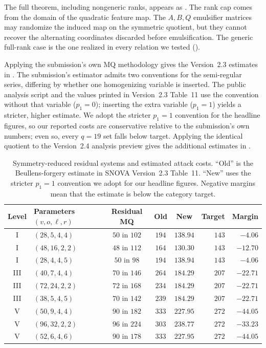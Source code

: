 \documentclass[11pt]{article}
\newcommand{\SNOVA}{\textsf{SNOVA}}
\begin{document}
The full theorem, including nongeneric ranks, appears as .  The rank cap comes from the domain of the quadratic feature map.  The $A,B,Q$ emulsifier matrices may randomize the induced map on the symmetric quotient, but they cannot recover the alternating coordinates discarded before emulsification.  The generic full-rank case is the one realized in every relation we tested ().

Applying the submission's own MQ methodology gives the Version~2.3 estimates in .  The submission's estimator admits two conventions for the semi-regular series, differing by whether one homogenizing variable is inserted.  The public analysis script and the values printed in Version~2.3 Table~11 use the convention without that variable ($p_1=0$); inserting the extra variable ($p_1=1$) yields a stricter, higher estimate.  We adopt the stricter $p_1=1$ convention for the headline figures, so our reported costs are conservative relative to the submission's own numbers; even so, every $q=19$ set falls below target.  Applying the identical quotient to the Version~2.4 analysis preview gives the additional estimates in .

\begin{table}[t]
\centering
\caption{Symmetry-reduced residual systems and estimated attack costs.  ``Old'' is the Beullens-forgery estimate in \SNOVA{} Version~2.3 Table~11.  ``New'' uses the stricter $p_1=1$ convention we adopt for our headline figures.  Negative margins mean that the estimate is below the category target.}\label{tab:main}
\small
\setlength{\tabcolsep}{4.2pt}
\begin{tabular}{@{}c l c c c r r@{}}
\toprule
Level & Parameters $(v,o,\ell,r)$ & Residual MQ & Old & New & Target & Margin\\
\midrule
I   & $(28,5,4,4)$   & $50$ in $102$ & $194$ & $138.94$ & $143$ & $-4.06$\\
I   & $(48,16,2,2)$  & $48$ in $112$ & $164$ & $130.30$ & $143$ & $-12.70$\\
I   & $(28,4,4,5)$   & $50$ in $98$  & $194$ & $138.94$ & $143$ & $-4.06$\\
\midrule
III & $(40,7,4,4)$   & $70$ in $146$ & $264$ & $184.29$ & $207$ & $-22.71$\\
III & $(72,24,2,2)$  & $72$ in $168$ & $234$ & $184.29$ & $207$ & $-22.71$\\
III & $(38,5,4,5)$   & $70$ in $142$ & $239$ & $184.29$ & $207$ & $-22.71$\\
\midrule
V   & $(50,9,4,4)$   & $90$ in $182$ & $333$ & $227.95$ & $272$ & $-44.05$\\
V   & $(96,32,2,2)$  & $96$ in $224$ & $303$ & $238.77$ & $272$ & $-33.23$\\
V   & $(52,6,4,6)$   & $90$ in $178$ & $333$ & $227.95$ & $272$ & $-44.05$\\
\bottomrule
\end{tabular}
\end{table}
\end{document}
